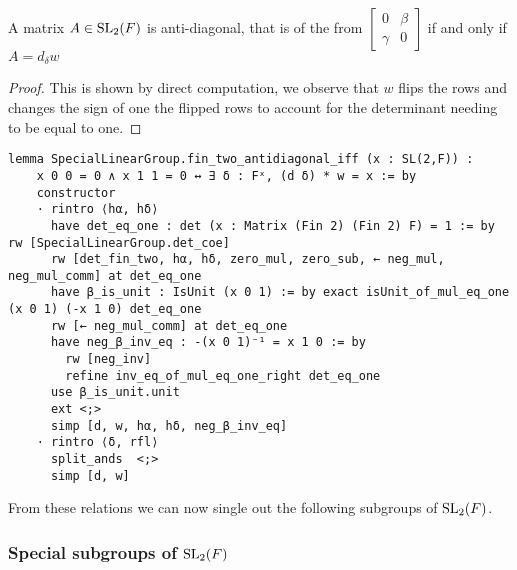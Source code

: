 \begin{corollary}
    \label{SpecialLinearGroup.fin_two_antidiagonal_iff}
    \leanok
    A matrix $A \in \operatorname{SL}_2(F)$ is anti-diagonal, that is of the from $\begin{bmatrix}
        0 & \beta\\
        \gamma & 0
    \end{bmatrix}$ if and only if $A = d_\delta w$
\end{corollary}
\begin{proof}
\leanok
This is shown by direct computation, we observe that $w$ flips the rows and changes the sign of one the flipped rows to account for the determinant needing to be equal to one.
\end{proof}
\begin{footnotesize}
\begin{verbatim}
lemma SpecialLinearGroup.fin_two_antidiagonal_iff (x : SL(2,F)) :
    x 0 0 = 0 ∧ x 1 1 = 0 ↔ ∃ δ : Fˣ, (d δ) * w = x := by
    constructor
    · rintro ⟨hα, hδ⟩
      have det_eq_one : det (x : Matrix (Fin 2) (Fin 2) F) = 1 := by rw [SpecialLinearGroup.det_coe]
      rw [det_fin_two, hα, hδ, zero_mul, zero_sub, ← neg_mul, neg_mul_comm] at det_eq_one
      have β_is_unit : IsUnit (x 0 1) := by exact isUnit_of_mul_eq_one (x 0 1) (-x 1 0) det_eq_one
      rw [← neg_mul_comm] at det_eq_one
      have neg_β_inv_eq : -(x 0 1)⁻¹ = x 1 0 := by
        rw [neg_inv]
        refine inv_eq_of_mul_eq_one_right det_eq_one
      use β_is_unit.unit
      ext <;>
      simp [d, w, hα, hδ, neg_β_inv_eq]
    · rintro ⟨δ, rfl⟩
      split_ands  <;>
      simp [d, w]
\end{verbatim}
\end{footnotesize}

From these relations we can now single out the following subgroups of $\operatorname{SL}_2(F)$.

\subsubsection{Special subgroups of $\operatorname{SL}_2(F)$}

